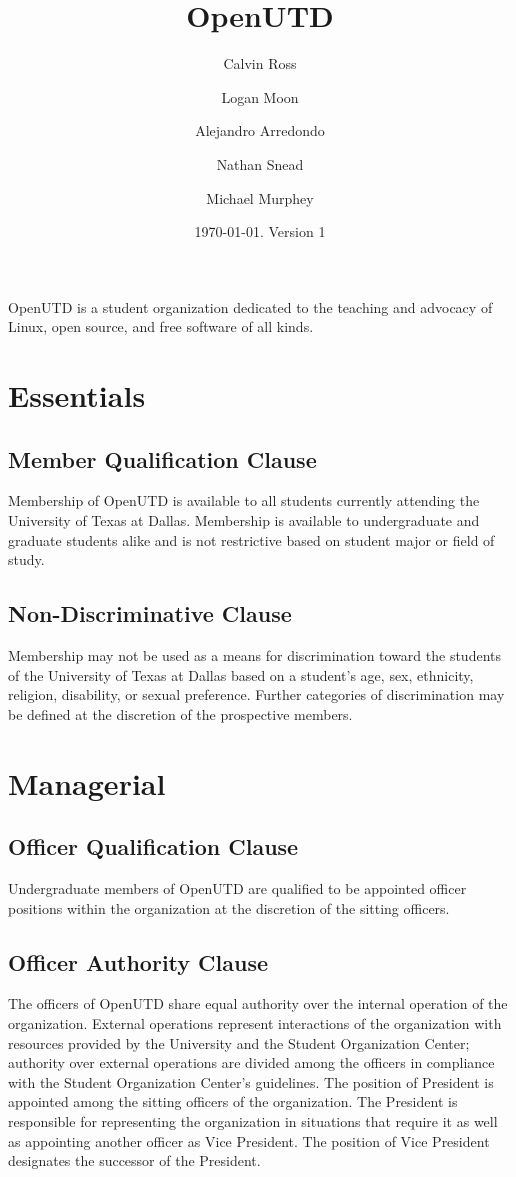 \documentclass{constitution}
\title{OpenUTD}
\author{Calvin Ross \and Logan Moon \and Alejandro Arredondo \and Nathan Snead \and Michael Murphey}
\date{\today. Version 1}
\begin{document}
\maketitle
\begin{center}
  OpenUTD is a student organization dedicated to the teaching and advocacy of Linux, open source, and free software of all kinds.
\end{center}

\section{Essentials}

\subsection{Member Qualification Clause}
Membership of OpenUTD is available to all students currently attending the University of Texas at Dallas.
Membership is available to undergraduate and graduate students alike and is not restrictive based on student major or field of study.

\subsection{Non-Discriminative Clause}
Membership may not be used as a means for discrimination toward the students of the University of Texas at Dallas based on a student's age, sex, ethnicity, religion, disability, or sexual preference.
Further categories of discrimination may be defined at the discretion of the prospective members.

\section{Managerial}

\subsection{Officer Qualification Clause}
Undergraduate members of OpenUTD are qualified to be appointed officer positions within the organization at the discretion of the sitting officers.

\subsection{Officer Authority Clause}
The officers of OpenUTD share equal authority over the internal operation of the organization.
External operations represent interactions of the organization with resources provided by the University and the Student Organization Center; authority over external operations are divided among the officers in compliance with the Student Organization Center's guidelines.
The position of President is appointed among the sitting officers of the organization.
The President is responsible for representing the organization in situations that require it as well as appointing another officer as Vice President.
The position of Vice President designates the successor of the President.
\end{document}
